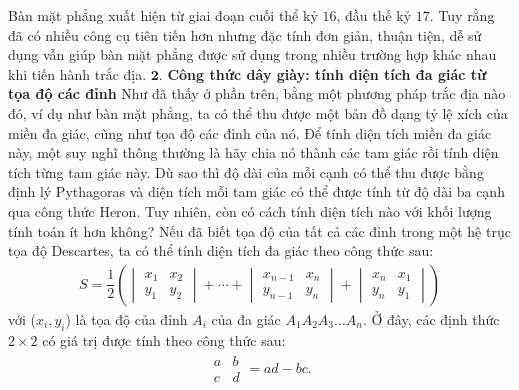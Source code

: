 \begin{multicols}{2}
\begin{tBox}
	\end{tBox}
	\vskip 0.1cm
	Bàn mặt phẳng xuất hiện từ giai đoạn cuối thể kỷ $16$, đầu thế kỷ $17$. Tuy rằng đã có nhiều công cụ tiên tiến hơn nhưng đặc tính đơn giản, thuận tiện, dễ sử dụng vẫn giúp bàn mặt phẳng được sử dụng trong nhiều trường hợp khác nhau khi tiến hành trắc địa.
	\vskip 0.1cm
	$\pmb{2.}$ \textbf{\color{toanhocdoisong}Công thức dây giày: tính diện tích đa giác từ tọa độ các đỉnh}
	\vskip 0.1cm
	Như đã thấy ở phần trên, bằng một phương pháp trắc địa nào đó, ví dụ như bàn mặt phẳng, ta có thể thu được một bản đồ dạng tỷ lệ xích của miền đa giác, cũng như tọa độ các đỉnh của nó. Để tính diện tích miền đa giác này, một suy nghĩ thông thường là hãy chia nó thành các tam giác rồi tính diện tích từng tam giác này. Dù sao thì độ dài của mỗi cạnh có thể thu được bằng định lý Pythagoras và diện tích mỗi tam giác có thể được tính từ độ dài ba cạnh qua công thức Heron.
	\vskip 0.1cm
	Tuy nhiên, còn có cách tính diện tích nào với khối lượng tính toán ít hơn không? Nếu đã biết tọa độ của tất cả các đỉnh trong một hệ trục tọa độ Descartes, ta có thể tính diện tích đa giác theo công thức sau:
	\begin{align*}
		S \!=\! \dfrac{1}{2}\!\left(\begin{vmatrix}
			x_1 \!&\!\! x_2\\
			y_1 \!&\!\! y_2
		\end{vmatrix} \!+\! \cdots \!+\! \begin{vmatrix}
		x_{n-1} \!&\!\! x_n\\
		y_{n-1} \!&\!\! y_n
	\end{vmatrix} + \begin{vmatrix}
	x_n \!&\!\! x_1\\
	y_n \!&\!\! y_1
	\end{vmatrix}\right)
	\end{align*}
	với ($x_i,y_i$) là tọa độ của đỉnh $A_i$ của đa giác $A_1 A_2 A_3\ldots A_n$.
	\vskip 0.05cm
	Ở đây, các định thức $2\times2$ có giá trị được tính theo công thức sau:
	\begin{align*}
		\begin{matrix}
			a & b\\
			c & d
		\end{matrix} = ad - bc.
	\end{align*}
	\begin{figure}[H]
		\vspace*{-5pt}
		\centering
		\captionsetup{labelformat= empty, justification=centering}

\end{figure}
\end{multicols}
